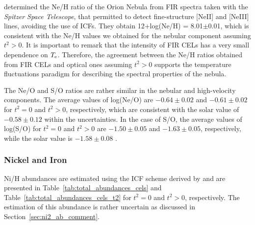 \documentclass[fleqn,usenatbib]{mnras}
\begin{document}
\citet{rubin2011} determined the Ne/H ratio of the Orion Nebula from FIR spectra taken with the {\it Spitzer Space Telescope}, that permitted to detect fine-structure [Ne\thinspace II] and [Ne\thinspace III] lines, avoiding the use of ICFs. They obtain 12+log(Ne/H) = 8.01$\pm$0.01, which is consistent with the Ne/H values we obtained for the nebular component assuming $t^2>0$. It is important to remark that the intensity of FIR CELs has a very small dependence on $T_{\rm e}$. Therefore, the agreement between the Ne/H ratios obtained from FIR CELs and optical ones assuming $t^2>0$ supports the temperature fluctuations paradigm for describing the spectral properties of the nebula.

The Ne/O and S/O ratios are rather similar in the nebular and high-velocity components. The average values of log(Ne/O) are $-0.64 \pm 0.02$ and $-0.61 \pm 0.02$ for $t^2=0$ and $t^2>0$, respectively, which are consistent with the solar value of $-0.58\pm 0.12$ \citep{lodders19} within the uncertainties. In the case of S/O, the average values of log(S/O) for $t^2=0$ and $t^2>0$ are $-1.50 \pm 0.05$ and $-1.63 \pm 0.05$, respectively, while the solar value is $-1.58\pm 0.08$ \citep{lodders19}.

\subsubsection{Nickel and Iron}
\label{subsubsec:total_abun_fe}

Ni/H abundances are estimated using the ICF scheme derived by \citet{delgadoinglada16} and are presented in Table~\ref{tab:total_abundances_cels} and Table~\ref{tab:total_abundances_cels_t2} for $t ^ 2 = 0$ and $t ^ 2> 0$, respectively. The estimation of this abundance is rather uncertain as discussed in Section~\ref{sec:ni2_ab_comment}.
\end{document}
